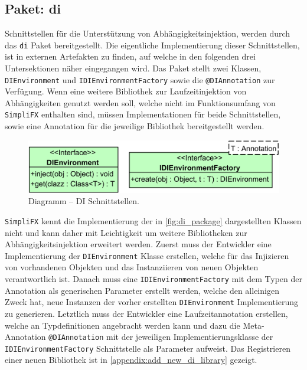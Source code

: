 \subsection{Paket: di}
\label{package_di}
Schnittstellen für die Unterstützung von Abhängigkeitsinjektion, werden durch das \texttt{di} Paket bereitgestellt. Die eigentliche Implementierung dieser Schnittstellen, ist in externen  Artefakten zu finden, auf welche in den folgenden drei Untersektionen näher eingegangen wird.
Das Paket stellt zwei Klassen, \texttt{DIEnvironment} und \texttt{IDIEnvironmentFactory} sowie die \texttt{@DIAnnotation} zur Verfügung. Wenn eine weitere Bibliothek zur Laufzeitinjektion von Abhängigkeiten genutzt werden soll, welche nicht im Funktionsumfang von \texttt{SimpliFX} enthalten sind, müssen Implementationen für beide Schnittstellen, sowie eine Annotation für die jeweilige Bibliothek bereitgestellt werden.
\begin{figure}[H]
	\centering
	\includegraphics[width=\textwidth-2cm]{Abbildungen/DI Paket.png}
	\caption{Diagramm -- DI Schnittstellen.}
	\label{fig:di_package}
\end{figure}
\noindent \texttt{SimpliFX} kennt die Implementierung der in \autoref{fig:di_package} dargestellten Klassen nicht und kann daher mit Leichtigkeit um weitere Bibliotheken zur Abhängigkeitsinjektion erweitert werden. Zuerst muss der Entwickler eine Implementierung der \texttt{DIEnvironment} Klasse erstellen, welche für das Injizieren von vorhandenen Objekten und das Instanziieren von neuen Objekten verantwortlich ist. Danach muss eine \texttt{IDIEnvironmentFactory} mit dem Typen der Annotation als generischen Parameter erstellt werden, welche den alleinigen Zweck hat, neue Instanzen der vorher erstellten \texttt{DIEnvironment} Implementierung zu generieren. Letztlich muss der Entwickler eine Laufzeitannotation erstellen, welche an Typdefinitionen angebracht werden kann und dazu die Meta-Annotation \texttt{@DIAnnotation} mit der jeweiligen Implementierungsklasse der \texttt{IDIEnvironmentFactory} Schnittstelle als Parameter aufweist. Das Registrieren einer neuen Bibliothek ist in \autoref{appendix:add_new_di_library} gezeigt.
